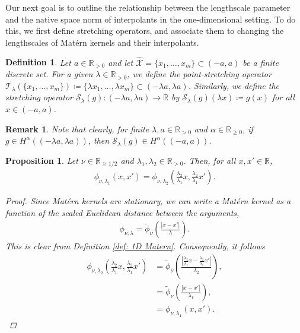 \documentclass[pdflatex,sn-mathphys-num]{sn-jnl}%
\theoremstyle{thmstyleone}%
\newtheorem{proposition}{Proposition}%
\theoremstyle{thmstyletwo}%
\newtheorem{remark}{Remark}%
\theoremstyle{thmstylethree}%
\newtheorem{definition}{Definition}%
\begin{document}
Our next goal is to outline the relationship between the lengthscale parameter and the native space norm of interpolants in the one-dimensional setting. To do this, we first define stretching operators, and associate them to changing the lengthscales of Mat\'ern kernels and their interpolants. 
\begin{definition}\label{def: stretching operators}
    Let \(a\in\mathbb{R}_{>0}\) and let \(\widehat{\mathcal{X}}=\{x_1,\dots,x_m\}\subset(-a,a)\) be a finite discrete set. For a given \(\lambda\in\mathbb{R}_{>0}\), we define the \emph{point-stretching operator} \(\mathcal{T}_{\lambda}(\{x_1,\dots,x_m\})\coloneqq\{\lambda x_1,\dots,\lambda x_m\}\subset(-\lambda a,\lambda a)\). 
    Similarly, we define the \emph{stretching operator} \(\mathcal{S}_{\lambda}(g):(-\lambda a, \lambda a)\rightarrow\mathbb{R}\) by \(\mathcal{S}_{\lambda}(g)(\lambda x) \coloneqq g(x)\) for all \(x\in(-a,a)\).
\end{definition}
\begin{remark}
    Note that clearly, for finite \(\lambda,a\in\mathbb{R}_{>0}\) and \(\alpha\in\mathbb{R}_{\geq0}\), if \(g\in H^{\alpha}((-\lambda a,\lambda a))\), then \(\mathcal{S}_\lambda(g)\in H^{\alpha}((-a,a))\).
\end{remark}
\begin{proposition}\label{prop: stretching kernels} Let \(\nu\in\mathbb{R}_{\geq1/2}\) and \(\lambda_1,\lambda_2\in \mathbb{R}_{>0}\). Then, for all \(x,x'\in\mathbb{R}\),
\begin{align}
    \phi_{\nu,\lambda_1}(x,x')=\phi_{\nu,\lambda_2}\left(\frac{\lambda_2}{\lambda_1}x,\frac{\lambda_2}{\lambda_1}x'\right).\nonumber
\end{align}
\begin{proof}
    Since Mat\'ern kernels are stationary, we can write a Mat\'ern kernel as a function of the scaled Euclidean distance between the arguments,
    \begin{align}
        \phi_{\nu,\lambda} = \tilde{\phi}_\nu\left(\frac{|x-x'|}{\lambda}\right).\nonumber
    \end{align}
    This is clear from Definition \ref{def: 1D Matern}. Consequently, it follows
    \begin{align}
        \phi_{\nu,\lambda_2}\left(\frac{\lambda_2}{\lambda_1}x,\frac{\lambda_2}{\lambda_1}x'\right) &= \tilde{\phi}_{\nu}\left(\frac{|\frac{\lambda_2}{\lambda_1}x-\frac{\lambda_2}{\lambda_1}x'|}{\lambda_2}\right),\nonumber\\
        &= \tilde{\phi}_{\nu}\left(\frac{|x-x'|}{\lambda_1}\right),\nonumber\\
        &=\phi_{\nu,\lambda_1}(x,x').\nonumber
    \end{align}
\end{proof}
    
\end{proposition}
\end{document}
